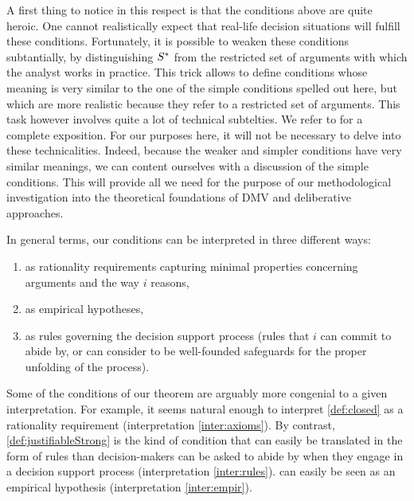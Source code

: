 \documentclass[version=3.21, pagesize, twoside=off, bibliography=totoc, DIV=calc, fontsize=12pt, a4paper, french, english]{scrartcl}
\begin{document}
A first thing to notice in this respect is that the conditions above are quite heroic. 
One cannot realistically expect that real-life decision situations will fulfill these conditions. 
Fortunately, it is possible to weaken these conditions subtantially, by distinguishing $S^*$ from the restricted set of arguments with which the analyst works in practice. 
This trick allows to define conditions whose meaning is very similar to the one of the simple conditions spelled out here, but which are more realistic because they refer to a restricted set of arguments. 
This task however involves quite a lot of technical subtelties. We refer to \citet{cailloux_formal_2018} for a complete exposition. For our purposes here, it will not be necessary to delve into these technicalities. 
Indeed, because the weaker and simpler conditions have very similar meanings, we can content ourselves with a discussion of the simple conditions. 
This will provide all we need for the purpose of our methodological investigation into the theoretical foundations of DMV and deliberative approaches.

In general terms, our conditions can be interpreted in three different ways:
\begin{enumerate}[label=\emph{\roman*}, ref=\emph{\roman*}]
	\item \label{inter:axioms} as rationality requirements capturing minimal properties concerning arguments and the way $i$ reasons,
	\item \label{inter:empir} as empirical hypotheses,
	\item \label{inter:rules} as rules governing the decision support process (rules that $i$ can commit to abide by, or can consider to be well-founded safeguards for the proper unfolding of the process).
\end{enumerate}

Some of the conditions of our theorem are arguably more congenial to a given interpretation. For example, it seems natural enough to interpret \cref{def:closed} as a rationality requirement (interpretation \ref{inter:axioms}). 
By contrast, \cref{def:justifiableStrong} is the kind of condition that can easily be translated in the form of rules than decision-makers can be asked to abide by when they engage in a decision support process (interpretation \ref{inter:rules}). 
 can easily be seen as an empirical hypothesis (interpretation \ref{inter:empir}).
\end{document}
